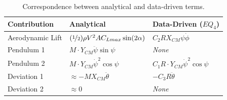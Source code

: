 \documentclass{article}
\begin{document}

\begin{table}[ht]
\centering
\begin{tabular}{|l|l|l|}
\hline
{\bf Contribution} & {\bf Analytical} & {\bf Data-Driven ($EQ_4$)}\\
\hline
Aerodynamic Lift & \((\nicefrac{1}{2})\rho V^2AC_{Lmax}\sin(2\alpha)\) & \(C_2RX_{CM}\psi\dot{\phi}\)\\
Pendulum 1 & \(M\cdot Y_{CM}\ddot{\psi}\sin{\psi}\) & \it{None} \\
Pendulum 2 & \(M\cdot Y_{CM}\dot{\psi}^2\cos{\psi}\) & \(C_1R\cdot Y_{CM}\dot{\psi}^2\cos{\psi}\) \\
Deviation 1 & \(\approx-MX_{CM}\ddot{\theta}\) & \(- C_3R\ddot{\theta}\)\\
Deviation 2 & \(\approx0\) & \it{None} \\
\hline
\end{tabular}
\caption{\label{table:eqcorrespondence}Correspondence between analytical and data-driven terms.}
\end{table}
\end{document}
